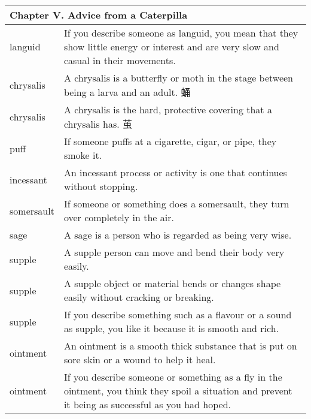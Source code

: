 \documentclass{article}
\begin{document}
\begin{center}
\begin{longtable}{|l|p{9cm}|}

\hline
\multicolumn{2}{|l|}{\textbf{Chapter V. Advice from a Caterpilla}}\\

\hline
languid
&
If you describe someone as languid, you mean that they show little energy or interest and are very slow and casual in their movements.
\\

\hline
chrysalis
&
A chrysalis is a butterfly or moth in the stage between being a larva and an adult. 蛹
\\

\hline
chrysalis
&
A chrysalis is the hard, protective covering that a chrysalis has. 茧
\\


\hline
puff
&
If someone puffs at a cigarette, cigar, or pipe, they smoke it.
\\

\hline
incessant
&
An incessant process or activity is one that continues without stopping.
\\

\hline
somersault
&
If someone or something does a somersault, they turn over completely in the air.
\\

\hline
sage
&
A sage is a person who is regarded as being very wise.
\\

\hline
supple
&
A supple person can move and bend their body very easily.
\\

\hline
supple
&
A supple object or material bends or changes shape easily without cracking or breaking.
\\

\hline
supple
&
If you describe something such as a flavour or a sound as supple, you like it because it is smooth and rich.
\\


\hline
ointment
&
An ointment is a smooth thick substance that is put on sore skin or a wound to help it heal.
\\

\hline
ointment
&
If you describe someone or something as a fly in the ointment, you think they spoil a situation and prevent it being as successful as you had hoped.
\\



\end{longtable}
\end{center}
\end{document}
